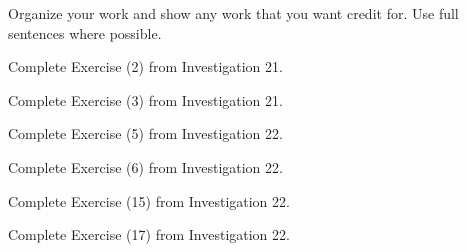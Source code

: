 \documentclass[addpoints]{exam}
\begin{document}
Organize your work and show any work that you want credit for. Use full sentences where possible.

\begin{questions}
\question 
Complete Exercise (2) from Investigation 21.

\question 
Complete Exercise (3) from Investigation 21.

\question 
Complete Exercise (5) from Investigation 22. 

\question 
Complete Exercise (6) from Investigation 22. 


\question
Complete Exercise (15) from Investigation 22. 

\question
Complete Exercise (17) from Investigation 22.





\end{questions}
\end{document}

